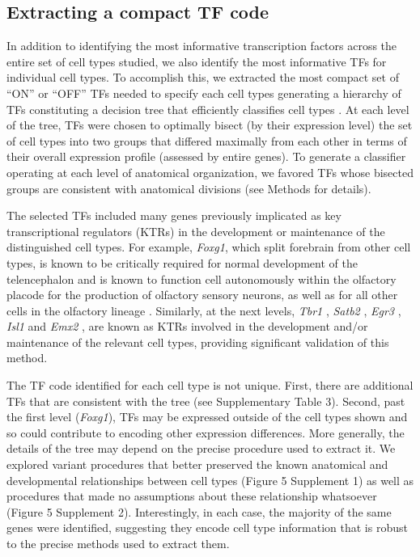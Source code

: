 \subsection{Extracting a compact TF code}
In addition to identifying the most informative transcription factors across the entire set of cell types studied, we also identify the most informative TFs for individual cell types. To accomplish this, we extracted the most compact set of “ON” or “OFF” TFs needed to specify each cell types generating a hierarchy of TFs constituting a decision tree  \citep{Saeys_2007} that efficiently classifies cell types \citep{Gabitto_2016}. At each level of the tree, TFs were chosen to optimally bisect (by their expression level) the set of cell types into two groups that differed maximally from each other in terms of their overall expression profile (assessed by entire genes). To generate a classifier operating at each level of anatomical organization, we favored TFs whose bisected groups are consistent with anatomical divisions (see Methods for details).

The selected TFs included many genes previously implicated as key transcriptional regulators (KTRs) in the development or maintenance of the distinguished cell types. For example, \textit{Foxg1}, which split forebrain from other cell types, is known to be critically required for normal development of the telencephalon \citep{Xuan_1995, Danesin_2012} and is known to function cell autonomously within the olfactory placode for the production of olfactory sensory neurons, as well as for all other cells in the olfactory lineage \citep{Duggan_2008}. 
Similarly, at the next levels, \textit{Tbr1} \citep{Bedogni_2010}, \textit{Satb2} \citep{Sweeney_2017}, \textit{Egr3} \citep{Chandra_2015}, \textit{Isl1} \citep{Lu_2013} and \textit{Emx2} \citep{Zhang_2016}, are known as KTRs involved in the development and/or maintenance of the relevant cell types, providing significant validation of this method.

The TF code identified for each cell type is not unique. First, there are additional TFs that are consistent with the tree (see Supplementary Table 3). Second, past the first level (\textit{Foxg1}), TFs may be expressed outside of the cell types shown and so could contribute to encoding other expression differences. More generally, the details of the tree may depend on the precise procedure used to extract it. We explored variant procedures that better preserved the known anatomical and developmental relationships between cell types (Figure 5 Supplement 1) as well as procedures that made no assumptions about these relationship whatsoever (Figure 5 Supplement 2). Interestingly, in each case, the majority of the same genes were identified, suggesting they encode cell type information that is robust to the precise methods used to extract them.

